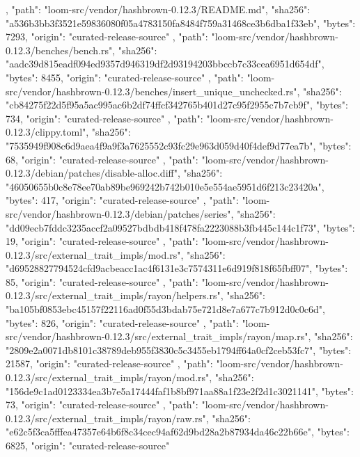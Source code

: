 {{    },
    {
      "path": "loom-src/vendor/hashbrown-0.12.3/README.md",
      "sha256": "a536b3bb3f3521e59836080f05a4783150fa8484f759a31468ce3b6dba1f33eb",
      "bytes": 7293,
      "origin": "curated-release-source"
    },
    {
      "path": "loom-src/vendor/hashbrown-0.12.3/benches/bench.rs",
      "sha256": "aadc39d815eadf094ed9357d946319df2d93194203bbccb7c33cea6951d654df",
      "bytes": 8455,
      "origin": "curated-release-source"
    },
    {
      "path": "loom-src/vendor/hashbrown-0.12.3/benches/insert_unique_unchecked.rs",
      "sha256": "cb84275f22d5f95a5ac995ac6b2df74ffcf342765b401d27c95f2955c7b7cb9f",
      "bytes": 734,
      "origin": "curated-release-source"
    },
    {
      "path": "loom-src/vendor/hashbrown-0.12.3/clippy.toml",
      "sha256": "7535949f908c6d9aea4f9a9f3a7625552c93fc29e963d059d40f4def9d77ea7b",
      "bytes": 68,
      "origin": "curated-release-source"
    },
    {
      "path": "loom-src/vendor/hashbrown-0.12.3/debian/patches/disable-alloc.diff",
      "sha256": "46050655b0c8e78ee70ab89be969242b742b010e5e554ae5951d6f213c23420a",
      "bytes": 417,
      "origin": "curated-release-source"
    },
    {
      "path": "loom-src/vendor/hashbrown-0.12.3/debian/patches/series",
      "sha256": "dd09ecb7fddc3235accf2a09527bdbdb418f478fa2223088b3fb445c144c1f73",
      "bytes": 19,
      "origin": "curated-release-source"
    },
    {
      "path": "loom-src/vendor/hashbrown-0.12.3/src/external_trait_impls/mod.rs",
      "sha256": "d69528827794524cfd9acbeacc1ac4f6131e3c7574311e6d919f818f65fbff07",
      "bytes": 85,
      "origin": "curated-release-source"
    },
    {
      "path": "loom-src/vendor/hashbrown-0.12.3/src/external_trait_impls/rayon/helpers.rs",
      "sha256": "ba105bf0853ebc45157f22116ad0f55d3bdab75e721d8e7a677c7b912d0c0c6d",
      "bytes": 826,
      "origin": "curated-release-source"
    },
    {
      "path": "loom-src/vendor/hashbrown-0.12.3/src/external_trait_impls/rayon/map.rs",
      "sha256": "2809e2a0071db8101c38789deb955f3830c5c3455eb1794ff64a0cf2ceb53fc7",
      "bytes": 21587,
      "origin": "curated-release-source"
    },
    {
      "path": "loom-src/vendor/hashbrown-0.12.3/src/external_trait_impls/rayon/mod.rs",
      "sha256": "156de9c1ad0123334ea3b7e5a17444faf1b8bf971aa88a1f23e2f2d1c3021141",
      "bytes": 73,
      "origin": "curated-release-source"
    },
    {
      "path": "loom-src/vendor/hashbrown-0.12.3/src/external_trait_impls/rayon/raw.rs",
      "sha256": "e62c5f3ca5fffea47357e64b6f8c34cec94af62d9bd28a2b87934da46c22b66e",
      "bytes": 6825,
      "origin": "curated-release-source"
}}
